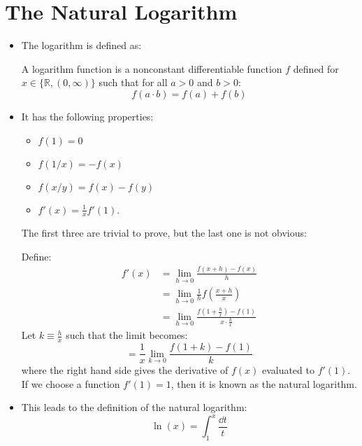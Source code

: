 \section{The Natural Logarithm}
\begin{itemize}
    \item The logarithm is defined as:
    \begin{definition}
        A logarithm function is a nonconstant differentiable function $f$ defined for $x\in \{\mathbb{R},(0,\infty)\}$ such that for all $a>0$ and $b>0$:
        \begin{equation}
            f(a\cdot b) = f(a)+f(b)
            \label{eq:}
        \end{equation}
    \end{definition}
    \item It has the following properties:
    \begin{itemize}
        \item $f(1)=0$
        \item $f(1/x)=-f(x)$
        \item $f(x/y)=f(x)-f(y)$
        \item $f'(x)=\frac{1}{x}f'(1)$.
    \end{itemize}
    The first three are trivial to prove, but the last one is not obvious:
    \begin{prooof}
        Define:
        \begin{align}
            f'(x)&=\lim_{h\to 0} \frac{f(x+h)-f(x)}{h} \\ 
            &= \lim_{h\to 0} \frac{1}{h}f\left(\frac{x+h}{x}\right) \\ 
            &= \lim_{h\to 0} \frac{f(1+\frac{h}{x})-f(1)}{x\cdot \frac{h}{x}} 
            \label{eq:}
        \end{align}
        Let $k\equiv \frac{h}{x}$ such that the limit becomes:
        \begin{equation}
            = \frac{1}{x} \lim_{k\to 0} \frac{f(1+k)-f(1)}{k}
            \label{eq:}
        \end{equation}
        where the right hand side gives the derivative of $f(x)$ evaluated to $f'(1)$. If we choose a function $f'(1)=1$, then it is known as the natural logarithm.
    \end{prooof}
    \item This leads to the definition of the natural logarithm:
    \begin{equation}
        \ln(x) = \int_1^x \frac{\dd{t}}{t}
        \label{eq:}
    \end{equation}

\end{itemize}
